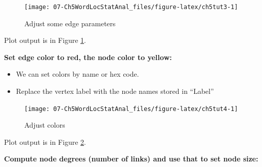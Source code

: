 \documentclass[
]{article}
\newenvironment{Shaded}{\begin{snugshade}}{\end{snugshade}}
\newcommand{\AttributeTok}[1]{\textcolor[rgb]{0.13,0.29,0.53}{#1}}
\newcommand{\DecValTok}[1]{\textcolor[rgb]{0.00,0.00,0.81}{#1}}
\newcommand{\FunctionTok}[1]{\textcolor[rgb]{0.13,0.29,0.53}{\textbf{#1}}}
\newcommand{\NormalTok}[1]{#1}
\newcommand{\OtherTok}[1]{\textcolor[rgb]{0.56,0.35,0.01}{#1}}
\newcommand{\SpecialCharTok}[1]{\textcolor[rgb]{0.81,0.36,0.00}{\textbf{#1}}}
\newcommand{\StringTok}[1]{\textcolor[rgb]{0.31,0.60,0.02}{#1}}
\providecommand{\tightlist}{%
  \setlength{\itemsep}{0pt}\setlength{\parskip}{0pt}}
\begin{document}
\begin{figure}

{\centering \texttt{[image: 07-Ch5WordLocStatAnal\_files/figure-latex/ch5tut3-1]} 

}

\caption{Adjust some edge parameters}\label{fig:ch5tut3}
\end{figure}

Plot output is in Figure \ref{fig:ch5tut3}.

\textbf{Set edge color to red, the node color to yellow:}

\begin{itemize}
\tightlist
\item
  We can set colors by name or hex code.
\item
  Replace the vertex label with the node names stored in ``Label''
\end{itemize}

\begin{Shaded}
\end{Shaded}

\begin{figure}

{\centering \texttt{[image: 07-Ch5WordLocStatAnal\_files/figure-latex/ch5tut4-1]} 

}

\caption{Adjust colors}\label{fig:ch5tut4}
\end{figure}

Plot output is in Figure \ref{fig:ch5tut4}.

\textbf{Compute node degrees (number of links) and use that to set node size:}

\begin{Shaded}
\end{Shaded}
\end{document}
